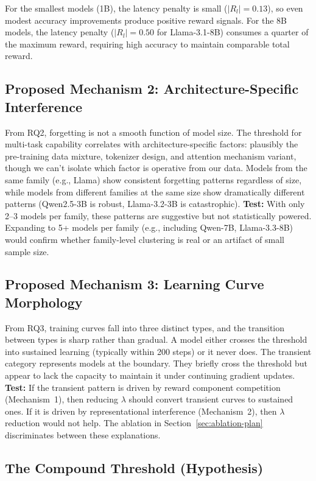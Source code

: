 \documentclass[11pt]{article}
\begin{document}
For the smallest models (1B), the latency penalty is small ($|R_l| = 0.13$), so even modest accuracy improvements produce positive reward signals.  For the 8B models, the latency penalty ($|R_l| = 0.50$ for Llama-3.1-8B) consumes a quarter of the maximum reward, requiring high accuracy to maintain comparable total reward.

\subsection{Proposed Mechanism 2: Architecture-Specific Interference}

From RQ2, forgetting is not a smooth function of model size.  The threshold for multi-task capability correlates with architecture-specific factors: plausibly the pre-training data mixture, tokenizer design, and attention mechanism variant, though we can't isolate which factor is operative from our data.  Models from the same family (e.g., Llama) show consistent forgetting patterns regardless of size, while models from different families at the same size show dramatically different patterns (Qwen2.5-3B is robust, Llama-3.2-3B is catastrophic).  \textbf{Test:} With only 2--3 models per family, these patterns are suggestive but not statistically powered.  Expanding to 5+ models per family (e.g., including Qwen-7B, Llama-3.3-8B) would confirm whether family-level clustering is real or an artifact of small sample size.

\subsection{Proposed Mechanism 3: Learning Curve Morphology}

From RQ3, training curves fall into three distinct types, and the transition between types is sharp rather than gradual.  A model either crosses the threshold into sustained learning (typically within 200 steps) or it never does.  The transient category represents models at the boundary.  They briefly cross the threshold but appear to lack the capacity to maintain it under continuing gradient updates.  \textbf{Test:} If the transient pattern is driven by reward component competition (Mechanism~1), then reducing $\lambda$ should convert transient curves to sustained ones.  If it is driven by representational interference (Mechanism~2), then $\lambda$ reduction would not help.  The ablation in Section~\ref{sec:ablation-plan} discriminates between these explanations.

\subsection{The Compound Threshold (Hypothesis)}
\end{document}
